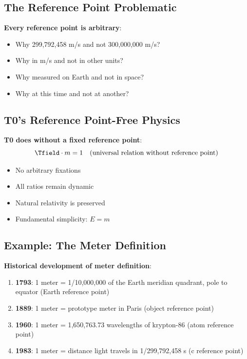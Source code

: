 	\subsection{The Reference Point Problematic}
	
	\textbf{Every reference point is arbitrary}:
	\begin{itemize}
		\item Why 299,792,458 m/s and not 300,000,000 m/s?
		\item Why in m/s and not in other units?
		\item Why measured on Earth and not in space?
		\item Why at this time and not at another?
	\end{itemize}
	
	\subsection{T0's Reference Point-Free Physics}
	
	\textbf{T0 does without a fixed reference point}:
	\begin{equation}
		\Tfield \cdot m = 1 \quad \text{(universal relation without reference point)}
	\end{equation}
	
	\begin{itemize}
		\item No arbitrary fixations
		\item All ratios remain dynamic
		\item Natural relativity is preserved
		\item Fundamental simplicity: $E = m$
	\end{itemize}
	
	\subsection{Example: The Meter Definition}
	
	\textbf{Historical development of meter definition}:
	\begin{enumerate}
		\item \textbf{1793}: 1 meter = 1/10,000,000 of the Earth meridian quadrant, pole to equator (Earth reference point)
		\item \textbf{1889}: 1 meter = prototype meter in Paris (object reference point)  
		\item \textbf{1960}: 1 meter = 1,650,763.73 wavelengths of krypton-86 (atom reference point)
		\item \textbf{1983}: 1 meter = distance light travels in 1/299,792,458 s (c reference point)
	\end{enumerate}
	
